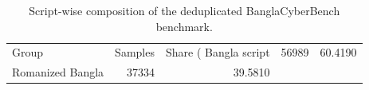 \begin{table}
\caption{Script-wise composition of the deduplicated BanglaCyberBench benchmark.}
\label{tab:dataset_script_composition}
\begin{tabular}{lrr}
\toprule
Group & Samples & Share (%
\midrule
Bangla script & 56989 & 60.4190 \\
Romanized Bangla & 37334 & 39.5810 \\
\bottomrule
\end{tabular}
\end{table}

